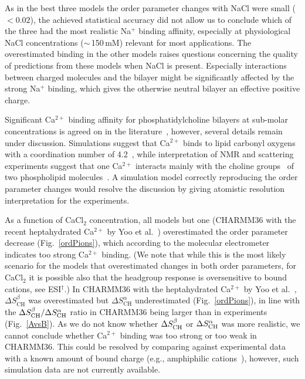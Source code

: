 \documentclass[twoside,twocolumn,9pt]{article}
\begin{document}
As in the best three models the order parameter changes with NaCl were small ($<0.02$),
the achieved statistical accuracy did not allow us to conclude 
which of the three had the most realistic Na$^+$ binding affinity,
especially at physiological NaCl concentrations ($\sim$\,150\,mM) 
relevant for most applications. 
The overestimated binding in the other models raises questions concerning the quality of predictions from these models when NaCl is present.
Especially interactions between charged molecules and the bilayer might be significantly
affected by the strong Na$^+$ binding, which gives the otherwise neutral bilayer an effective positive charge.

Significant Ca$^{2+}$ binding affinity for phosphatidylcholine bilayers at sub-molar concentrations  
is agreed on in the literature~\cite{akutsu81,altenbach84,cevc90,tocanne90}, however, several
details remain under discussion. Simulations suggest that Ca$^{2+}$ binds to lipid carbonyl
oxygens with a coordination number of 4.2~\cite{bockmann04}, while interpretation of NMR and 
scattering experiments suggest that one Ca$^{2+}$ interacts mainly with the choline 
groups~\cite{hauser76,hauser78,herbette84} of two phospholipid molecules~\cite{altenbach84}. 
A simulation model correctly reproducing the order parameter changes would resolve the discussion
by giving atomistic resolution interpretation for the experiments.

As a function of CaCl$_2$ concentration, all models but one (CHARMM36 with the recent heptahydrated Ca$^{2+}$ by Yoo et al.~\cite{yoo16})
overestimated the order parameter decrease (Fig.~\ref{ordPions}),
which according to the molecular electrometer indicates too strong Ca$^{2+}$ binding.
(We note that while this is the most likely scenario for the models that overestimated changes in both order parameters,
for CaCl$_2$ it is possible also that the headgroup response is oversensitive to
bound cations, see ESI$^\dag$.)
In CHARMM36 with the heptahydrated Ca$^{2+}$ by Yoo et al.~\cite{yoo16},
$\Delta S_\mathrm{CH}^\beta$ was overestimated  but $\Delta S_\mathrm{CH}^\alpha$ underestimated (Fig.~\ref{ordPions}),
in line with the $\Delta S_{\rm{CH}}^{\beta}/\Delta S_{\rm{CH}}^{\alpha}$ ratio
in CHARMM36 being larger than in experiments (Fig.~\ref{AvsB}). As we do not know whether $\Delta S_{\rm{CH}}^{\beta}$ or $\Delta S_{\rm{CH}}^{\alpha}$
was more realistic, we cannot conclude whether Ca$^{2+}$ binding was too strong or too weak in CHARMM36.
This could be resolved by comparing against experimental data with a known amount of bound charge 
(e.g., amphiphilic cations~\cite{scherer89,franzin98}), however, such simulation data are not
currently available.
\end{document}
